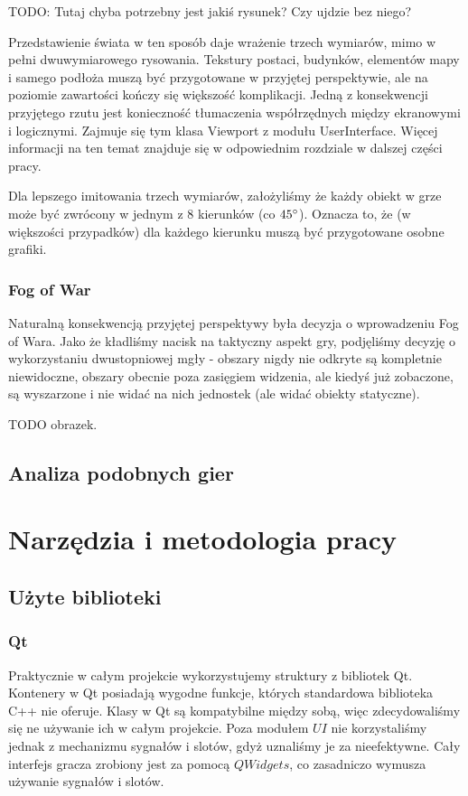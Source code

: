 \documentclass[licencjacka]{pracamgr}
\begin{document}
    TODO: Tutaj chyba potrzebny jest jakiś rysunek? Czy ujdzie bez niego?

    Przedstawienie świata w ten sposób daje wrażenie trzech wymiarów, mimo w pełni dwuwymiarowego rysowania. Tekstury
    postaci, budynków, elementów mapy i samego podłoża muszą być przygotowane w przyjętej perspektywie, ale na poziomie
    zawartości kończy się większość komplikacji. Jedną z konsekwencji przyjętego rzutu jest konieczność tłumaczenia
    współrzędnych między ekranowymi i logicznymi. Zajmuje się tym klasa Viewport z modułu UserInterface. Więcej
    informacji na ten temat znajduje się w odpowiednim rozdziale w dalszej części pracy.

    Dla lepszego imitowania trzech wymiarów, założyliśmy że każdy obiekt w grze może być zwrócony w jednym z 8 kierunków
    (co $45\degree$). Oznacza to, że (w większości przypadków) dla każdego kierunku muszą być przygotowane osobne
    grafiki.

    \subsection{Fog of War}
    Naturalną konsekwencją przyjętej perspektywy była decyzja o wprowadzeniu Fog of Wara. Jako że kładliśmy nacisk na
    taktyczny aspekt gry, podjęliśmy decyzję o wykorzystaniu dwustopniowej mgły - obszary nigdy nie odkryte są
    kompletnie niewidoczne, obszary obecnie poza zasięgiem widzenia, ale kiedyś już zobaczone, są wyszarzone i nie widać
    na nich jednostek (ale widać obiekty statyczne).

    TODO obrazek.

  \section{Analiza podobnych gier}

\chapter{Narzędzia i metodologia pracy}
  \section{Użyte biblioteki}
    \subsection{Qt}
    Praktycznie w całym projekcie wykorzystujemy struktury z bibliotek Qt. Kontenery w Qt posiadają wygodne funkcje,
    których standardowa biblioteka C++ nie oferuje. Klasy w Qt są kompatybilne między sobą, więc zdecydowaliśmy się ne
    używanie ich w całym projekcie. Poza modułem $UI$ nie korzystaliśmy jednak z mechanizmu sygnałów i slotów, gdyż
    uznaliśmy je za nieefektywne. Cały interfejs gracza zrobiony jest za pomocą $QWidgets$, co zasadniczo wymusza
    używanie sygnałów i slotów.
\end{document}
